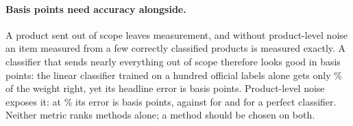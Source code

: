 \paragraph{Basis points need accuracy alongside.} A product sent out of scope leaves
measurement, and without product-level noise an item measured from a few correctly
classified products is measured exactly. A classifier that sends nearly everything out of
scope therefore looks good in basis points: the \NameEfive{} linear classifier trained on a
hundred official labels alone gets only \AccWEfiveLinMocHundred\% of the weight right, yet its
headline error is \BpYoyRmseHeadlineEfiveLinMocHundred{} basis points. Product-level noise
exposes it: at \CfgSigmaHi\% its error is \BpYoyRmseHeadlineEfiveLinMocHundredNoiseTen{} basis
points, against \BpYoyRmseHeadlineOpusNoiseTen{} for \NameOpus{} and
\BpYoyRmseHeadlinePerfectNoiseTen{} for a perfect classifier. Neither metric ranks methods
alone; a method should be chosen on both.
